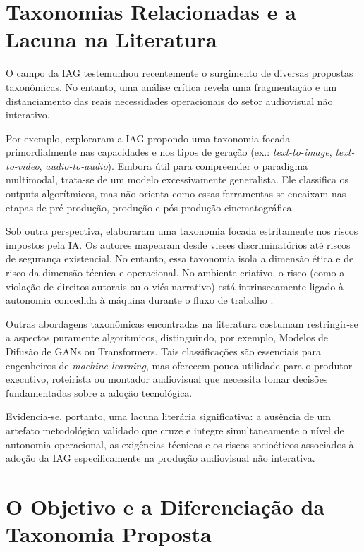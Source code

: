\section{Taxonomias Relacionadas e a Lacuna na Literatura}
\label{sec:tax:relacionadas}

O campo da IAG testemunhou recentemente o surgimento de diversas propostas taxonômicas. No entanto, uma análise crítica revela uma fragmentação e um distanciamento das reais necessidades operacionais do setor audiovisual não interativo.

Por exemplo, \citet{strobel2024} exploraram a IAG propondo uma taxonomia focada primordialmente nas capacidades e nos tipos de geração (ex.: \textit{text-to-image}, \textit{text-to-video}, \textit{audio-to-audio}). Embora útil para compreender o paradigma multimodal, trata-se de um modelo excessivamente generalista. Ele classifica os outputs algorítmicos, mas não orienta como essas ferramentas se encaixam nas etapas de pré-produção, produção e pós-produção cinematográfica.

Sob outra perspectiva, \citet{slattery2024} elaboraram uma taxonomia focada estritamente nos riscos impostos pela IA. Os autores mapearam desde vieses discriminatórios até riscos de segurança existencial. No entanto, essa taxonomia isola a dimensão ética e de risco da dimensão técnica e operacional. No ambiente criativo, o risco (como a violação de direitos autorais ou o viés narrativo) está intrinsecamente ligado à autonomia concedida à máquina durante o fluxo de trabalho \citep{floridi2020gpt3}.

Outras abordagens taxonômicas encontradas na literatura costumam restringir-se a aspectos puramente algorítmicos, distinguindo, por exemplo, Modelos de Difusão de GANs ou Transformers. Tais classificações são essenciais para engenheiros de \textit{machine learning}, mas oferecem pouca utilidade para o produtor executivo, roteirista ou montador audiovisual que necessita tomar decisões fundamentadas sobre a adoção tecnológica.

Evidencia-se, portanto, uma lacuna literária significativa: a ausência de um artefato metodológico validado que cruze e integre simultaneamente o nível de autonomia operacional, as exigências técnicas e os riscos socioéticos associados à adoção da IAG especificamente na produção audiovisual não interativa.

\section{O Objetivo e a Diferenciação da Taxonomia Proposta}
\label{sec:tax:objetivo}

